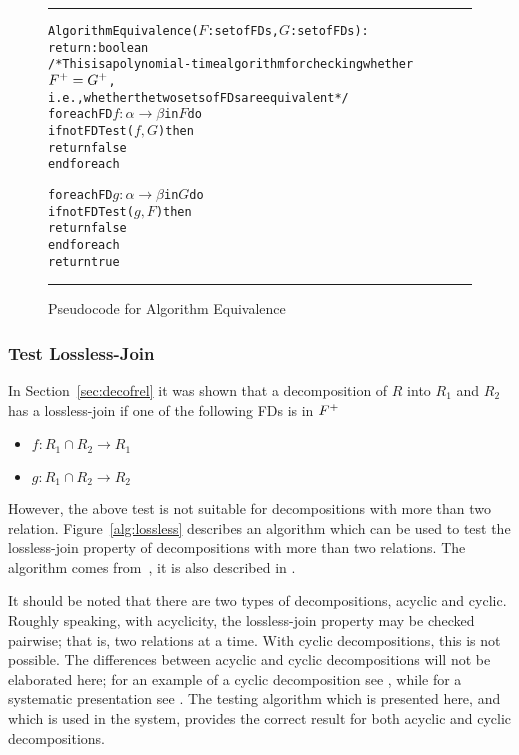\begin{figure}[htbp]
\hrule
\vspace{0.25cm}
\begin{alltt}
Algorithm Equivalence(\(F\): set of FDs, \(G\): set of FDs):
            return: boolean
/* This is a polynomial-time algorithm for checking whether \(F\sp{+} = G\sp{+}\), 
  i.e., whether the two sets of FDs are equivalent */ 
  foreach FD \(f : \alpha \rightarrow \beta\) in \(F\) do
    if not FDTest(\(f, G\)) then
      return false
  end foreach
  
  foreach FD \(g : \alpha \rightarrow \beta\) in \(G\) do
    if not FDTest(\(g, F\)) then
      return false
  end foreach
  return true
\end{alltt}
\caption{Pseudocode for Algorithm Equivalence}\label{alg:equivalence}
\hrule
\end{figure}

\subsubsection{Test Lossless-Join}
In Section~\ref{sec:decofrel} it was shown that a decomposition of $R$ into $R_1$ and $R_2$ 
has a lossless-join if one of the following FDs is in $F\sp{+}$
\begin{itemize}
  \item $f : R_1 \cap R_2 \rightarrow R_1$ 
  \item $g : R_1 \cap R_2 \rightarrow R_2$ 
\end{itemize}

However, the above test is not suitable for decompositions with more than two relation. 
Figure~\ref{alg:lossless} describes an algorithm which can be used to test
the lossless-join property of decompositions with more than two relations. The algorithm comes 
from~\cite[Section 3]{AhoBU79}, it is also described in \cite[Algorithm 11.1]{bdb1}.

It should be noted that there are two types of decompositions, acyclic and cyclic.
Roughly speaking, with acyclicity, the lossless-join property may be
checked pairwise; that is, two relations at a time.  With cyclic
decompositions, this is not possible.  
The differences between acyclic and cyclic decompositions will
not be elaborated here; for an example of a cyclic decomposition see
\cite[Section 7]{AhoBU79}, while for a systematic presentation see
\cite{BeeriFMY83}. The testing algorithm which is presented here,
and which is used in the system, provides the correct
result for both acyclic and cyclic decompositions. 

